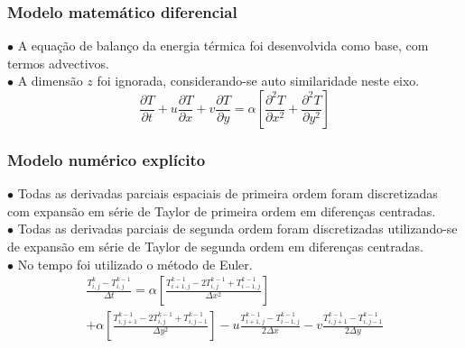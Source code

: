 \documentclass[xcolor=dvipsnames,10pt,aspectratio=169]{beamer}
\begin{document}
	\begin{frame}
		\frametitle{Modelo matemático diferencial}
		$\bullet$ A equação de balanço da energia térmica foi desenvolvida como base, com termos advectivos.\\
		$\bullet$ A dimensão $z$ foi ignorada, considerando-se auto similaridade neste eixo.\\

		\begin{equation}
			\frac{\partial T}{\partial t} + u \frac{\partial T}{\partial x} + v \frac{\partial T}{\partial y} = \alpha \left[  \frac{\partial^2 T}{\partial x^2} + \frac{\partial^2 T}{\partial y^2}   \right]
		\end{equation}

	\end{frame}





	\begin{frame}
		\frametitle{Modelo numérico explícito}

		$\bullet$ Todas as derivadas parciais espaciais de primeira ordem foram discretizadas com expansão em série de Taylor de primeira ordem em diferenças centradas.\\
		$\bullet$ Todas as derivadas parciais de segunda ordem foram discretizadas utilizando-se de expansão em série de Taylor de segunda ordem em diferenças centradas.\\
		$\bullet$ No tempo foi utilizado o método de Euler.\\

		\begin{equation}
			\begin{split}
			\frac{T_{i,j}^{k} - T_{i , j}^{k-1} }{\Delta t}
			= \alpha \left[  \frac{T_{i+1,j}^{k-1} - 2 T_{i,j}^{k-1} + T_{i-1,j}^{k-1} }{\Delta x^2} \right]\\
			+\alpha \left[\frac{T_{i,j+1}^{k-1} - 2 T_{i,j}^{k-1} + T_{i,j-1}^{k-1}}{\Delta y^2}\right] - u \frac{T_{i+1,j}^{k-1} - T_{i-1,j}^{k-1}}{2 \Delta x} - v \frac{T_{i,j+1}^{k-1} - T_{i , j-1}^{k-1}}{2 \Delta y}
			\end{split}
		\end{equation}

	\end{frame}
\end{document}
